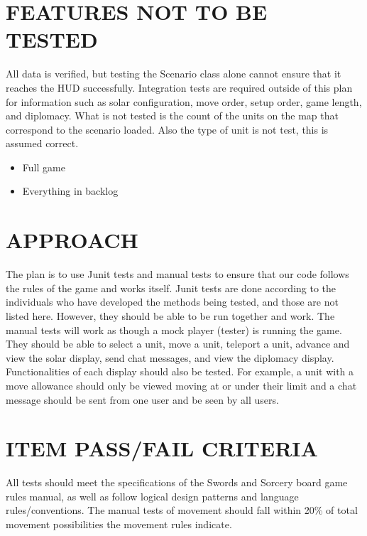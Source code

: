 \section[FEATURES NOT TO BE TESTED]{\bfseries\color{black}
	 FEATURES NOT TO BE TESTED}
{\color{black}
All data is verified, but testing the Scenario class alone cannot ensure 
that it reaches the HUD successfully. Integration tests are required outside 
of this plan for information such as solar configuration, move order, setup order, 
game length, and diplomacy.
\newline
\newline
What is not tested is the count of the units on the map that correspond to the scenario loaded. Also the type of unit is not test, this is assumed correct. 
\begin{itemize}
\item Full game
\item Everything in backlog
\end{itemize}
}

\section[APPROACH]{\bfseries\color{black} APPROACH}
{\color{black}
The plan is to use Junit tests and manual tests to ensure that our code follows the rules of the game and works itself. Junit tests are done according to the individuals who have developed the methods being tested, and those are not listed here. However, they should be able to be run together and work. The manual tests will work as though a mock player (tester) is running the game. They should be able to select a unit, move a unit, teleport a unit, advance and view the solar display, send chat messages, and view the diplomacy display. Functionalities of each display should also be tested. For example, a unit with a move allowance should only be viewed moving at or under their limit and a chat message should be sent from one user and be seen by all users.
}

\section[ITEM PASS/FAIL CRITERIA]{\bfseries\color{black}
	 ITEM PASS/FAIL CRITERIA}
{\color{black}
All tests should meet the specifications of the Swords and Sorcery board game rules manual, as well as follow logical design patterns and language rules/conventions. The manual tests of movement should fall within 20\% of total movement possibilities the movement rules indicate.
}

